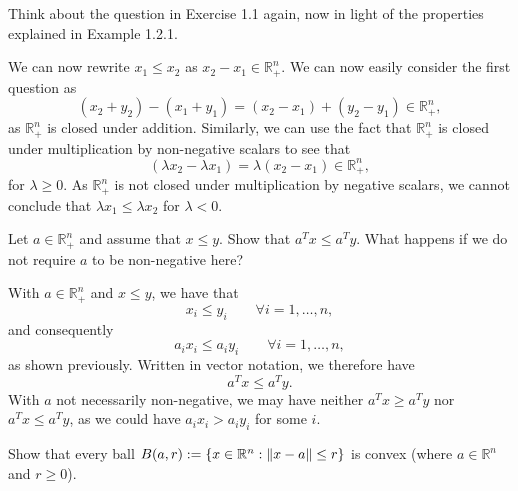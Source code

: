 \begin{exercise}
  Think about the question in Exercise 1.1 again, now in light of the properties explained in Example 1.2.1.
\end{exercise}

\begin{solution}
  We can now rewrite $x_1 \leq x_2$ as $x_2 - x_1 \in \mathbb{R}^n_+$.
  We can now easily consider the first question as
  \begin{equation}
    (x_2 + y_2) - (x_1 + y_1) = (x_2 - x_1) + (y_2 - y_1) \in \mathbb{R}^n_+,
  \end{equation}
  as $\mathbb{R}^n_+$ is closed under addition.
  Similarly, we can use the fact that $\mathbb{R}^n_+$ is closed under multiplication by non-negative scalars to see that
  \begin{equation}
    (\lambda x_2 - \lambda x_1) = \lambda (x_2 - x_1) \in \mathbb{R}^n_+,
  \end{equation}
  for $\lambda \geq 0$.
  As $\mathbb{R}^n_+$ is not closed under multiplication by negative scalars, we cannot conclude that $\lambda x_1 \leq \lambda x_2$ for $\lambda < 0$.
\end{solution}

\begin{exercise}
  Let $a \in \mathbb{R}^n_+$ and assume that $x \leq y$.
  Show that $a^T x \leq a^T y$.
  What happens if we do not require $a$ to be non-negative here?
\end{exercise}

\begin{solution}
  With $a \in \mathbb{R}^n_+$ and $x \leq y$, we have that
  \begin{equation}
    x_i \leq y_i \qquad \forall i = 1, \ldots, n,
  \end{equation}
  and consequently
  \begin{equation}
    a_i x_i \leq a_i y_i \qquad \forall i = 1, \ldots, n,
  \end{equation}
  as shown previously.
  Written in vector notation, we therefore have
  \begin{equation}
    a^T x \leq a^T y.
  \end{equation}
  With $a$ not necessarily non-negative, we may have neither $a^T x \geq a^T y$ nor $a^T x \leq a^T y$, as we could have $a_i x_i > a_i y_i$ for some $i$.
\end{solution}

\begin{exercise}
  Show that every ball $B(a, r): = \{ x \in \mathbb{R}^n : \lVert x - a\rVert \leq r \}$ is convex (where $a \in \mathbb{R}^n$ and $r \geq 0$).
\end{exercise}

